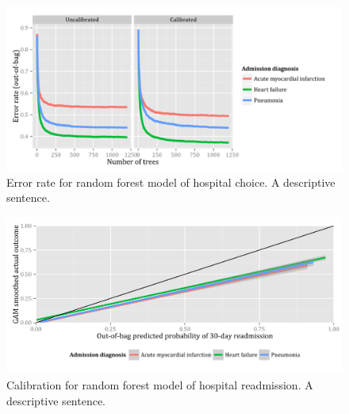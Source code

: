 \documentclass[]{article}\usepackage[]{graphicx}\usepackage[]{color}
\begin{document}
\begin{figure}[H]
    \includegraphics{../figures/error_rate_for_hospital_choice.png}
    \caption[Error rate for random forest model of hospital choice.]
      {Error rate for random forest model of hospital choice. A descriptive sentence.}
    \label{fig:error_rate_for_hospital_choice}
\end{figure}

\begin{figure}[H]
    \includegraphics{../figures/rf_calibration.png}
    \caption[Calibration for random forest model of hospital readmission.]
      {Calibration for random forest model of hospital readmission. A descriptive sentence.}
    \label{fig:error_rate_for_hospital_choice}
\end{figure}
\end{document}
